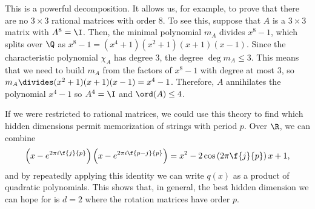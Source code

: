 This is a powerful decomposition. It allows us, for example, to prove that there are no $3 \times 3$ rational matrices with order $8$. To see this, suppose that $A$ is a $3 \times 3$ matrix with $A^8 = \I$. Then, the minimal polynomial $m_A$ divides $x^8 - 1$, which splits over $\Q$ as $x^8 - 1 = (x^4 + 1)(x^2 + 1)(x + 1)(x - 1)$. Since the characteristic polynomial $\chi_A$ has degree $3$, the degree $\deg m_A \leq 3$. This means that we need to build $m_A$ from the factors of $x^8 - 1$ with degree at most $3$, so $m_A \divides (x^2 + 1)(x + 1)(x - 1) = x^4 - 1$. Therefore, $A$ annihilates the polynomial $x^4 - 1$ so $A^4 = \I$ and $\ord(A) \leq 4$.

If we were restricted to rational matrices, we could use this theory to find which hidden dimensions permit memorization of strings with period $p$. Over $\R$, we can combine \[ \left(x - e^{2 \pi i \f{j}{p}}\right)\left(x - e^{2 \pi i \f{p - j}{p}}\right) = x^2 - 2 \cos\left(2 \pi \f{j}{p}\right) x + 1, \] and by repeatedly applying this identity we can write $q(x)$ as a product of quadratic polynomials. This shows that, in general, the best hidden dimension we can hope for is $d = 2$ where the rotation matrices have order $p$.

